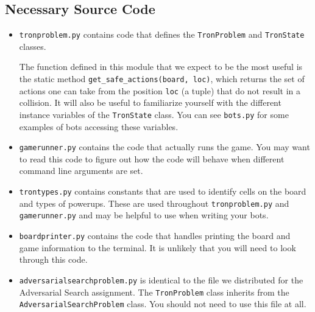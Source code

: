 \documentclass{article}
\begin{document}
    \subsection{Necessary Source Code}
    \begin{itemize}
        \item \texttt{tronproblem.py} contains code that defines the \texttt{TronProblem} and \texttt{TronState} classes.

        The function defined in this module that we expect to be the most useful is the static method \texttt{get\_safe\_actions(board, loc)}, which returns the set of actions one can take from the position \texttt{loc} (a tuple) that do not result in a collision. It will also be useful to familiarize yourself with the different instance variables of the \texttt{TronState} class. You can see \texttt{bots.py} for some examples of bots accessing these variables.

        \item \texttt{gamerunner.py} contains the code that actually runs the game. You may want to read this code to figure out how the code will behave when different command line arguments are set.

        \item \texttt{trontypes.py} contains constants that are used to identify cells on the board and types of powerups. These are used throughout \texttt{tronproblem.py} and \texttt{gamerunner.py} and may be helpful to use when writing your bots.

        \item \texttt{boardprinter.py} contains the code that handles printing the board and game information to the terminal. It is unlikely that you will need to look through this code.

        \item \texttt{adversarialsearchproblem.py} is identical to the file we distributed for the Adversarial Search assignment. The \texttt{TronProblem} class inherits from the \texttt{AdversarialSearchProblem} class. You should not need to use this file at all.

    \end{itemize}
\end{document}
